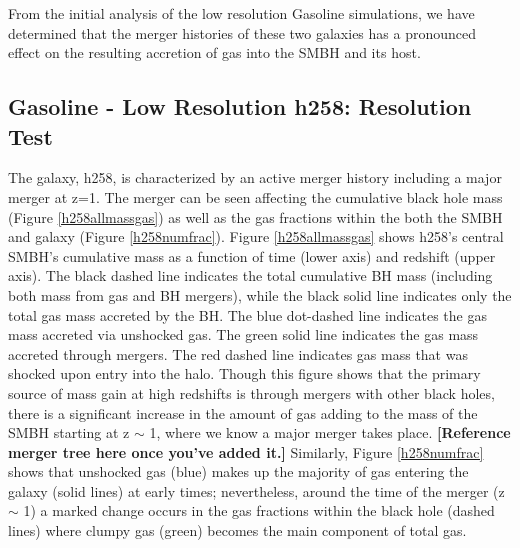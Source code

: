 \documentclass[manuscript]{aastex}
\begin{document}
From the initial analysis of the low resolution Gasoline simulations, we have determined that the merger histories of these two galaxies has a pronounced effect on the resulting accretion of gas into the SMBH and its host. 

\subsection{Gasoline - Low Resolution h258: Resolution Test}
	
The galaxy, h258, is characterized by an active merger history including a major merger at z=1. The merger can be seen affecting the cumulative black hole mass (Figure \ref{h258allmassgas}) as well as the gas fractions within the both the SMBH and galaxy (Figure \ref{h258numfrac}). 
Figure \ref{h258allmassgas} shows h258's central SMBH's cumulative mass as a function of time (lower axis) and redshift (upper axis). The black dashed line indicates the total cumulative BH mass (including both mass from gas and BH mergers), while the black solid line indicates only the total gas mass accreted by the BH. The blue dot-dashed line indicates the gas mass accreted via unshocked gas. The green solid line indicates the gas mass accreted through mergers. The red dashed line indicates gas mass that was shocked upon entry into the halo. Though this figure shows that the primary source of mass gain at high redshifts is through mergers with other black holes, there is a significant increase in the amount of gas adding to the mass of the SMBH starting at z $\sim$ 1, where we know a major merger takes place. \textbf{[Reference merger tree here once you've added it.]} Similarly, Figure \ref{h258numfrac} shows that unshocked gas (blue) makes up the majority of gas entering the galaxy (solid lines) at early times; nevertheless, around the time of the merger (z $\sim$ 1) a marked change occurs in the gas fractions within the black hole (dashed lines) where clumpy gas (green) becomes the main component of total gas. 
\end{document}

